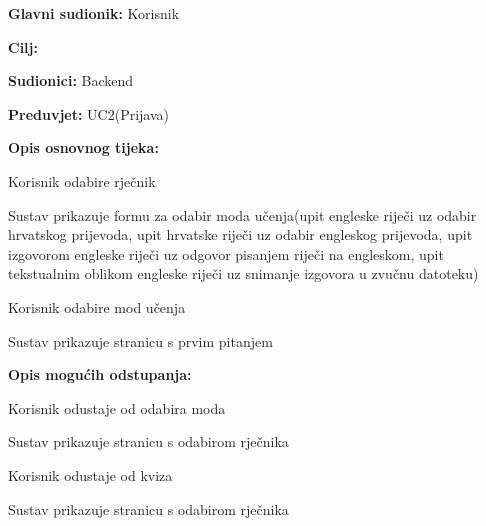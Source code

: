 					\noindent {}
					\begin{packed_item}
						
						\item \textbf{Glavni sudionik: } Korisnik
						\item  \textbf{Cilj:} 
						\item  \textbf{Sudionici:} Backend
						\item  \textbf{Preduvjet:} UC2(Prijava)
						\item  \textbf{Opis osnovnog tijeka:}
						
						\item[] \begin{packed_enum}
							
							\item Korisnik odabire rječnik
							\item Sustav prikazuje formu za odabir moda učenja(upit engleske riječi uz odabir hrvatskog prijevoda, upit hrvatske riječi uz odabir engleskog prijevoda, upit izgovorom engleske riječi uz odgovor pisanjem riječi na engleskom, upit tekstualnim oblikom engleske riječi uz snimanje izgovora u zvučnu datoteku)
							\item Korisnik odabire mod učenja
							\item Sustav prikazuje stranicu s prvim pitanjem
						\end{packed_enum}
						
						\item  \textbf{Opis mogućih odstupanja:}
						
						\item[] \begin{packed_item}
							
							\item[3.a] Korisnik odustaje od odabira moda
							\item[] \begin{packed_enum}
								
								\item Sustav prikazuje stranicu s odabirom rječnika
								
							\end{packed_enum}
							
							\item[4.a] Korisnik odustaje od kviza 
							\item[] \begin{packed_enum}
								
								\item Sustav prikazuje stranicu s odabirom rječnika
								
							\end{packed_enum}
							
						\end{packed_item}
					\end{packed_item}
					

